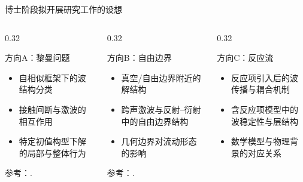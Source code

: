 \documentclass{beamer}
\begin{document}
\begin{frame}{博士阶段拟开展研究工作的设想}
\small

\setlength{\columnsep}{0.6em}

\begin{columns}[T,totalwidth=\textwidth]
    \begin{column}{0.32\textwidth}
        \begin{block}{方向A：黎曼问题}
        \begin{minipage}[t]{\linewidth}
        \footnotesize
        \raggedright
        {\setlength{\itemsep}{0.30em}
        \begin{itemize}
            \item 自相似框架下的波结构分类
            \item 接触间断与激波的相互作用
            \item 特定初值构型下解的局部与整体行为
        \end{itemize}}

        \vspace{0.2em}
        {\scriptsize 参考：\cite{ZhangZheng1990,ChangChenYang1995,ChangChenYang2000}.}
        \end{minipage}
        \end{block}
    \end{column}

    \begin{column}{0.32\textwidth}
        \begin{block}{方向B：自由边界}
        \begin{minipage}[t]{\linewidth}
        \footnotesize
        \raggedright
        {\setlength{\itemsep}{0.30em}
        \begin{itemize}
            \item 真空/自由边界附近的解结构
            \item 跨声激波与反射--衍射中的自由边界结构
            \item 几何边界对流动形态的影响
        \end{itemize}}

        \vspace{0.2em}
        {\scriptsize 参考：\cite{ChenFeldman2003,ChenFeldman2018}.}
        \end{minipage}
        \end{block}
    \end{column}

    \begin{column}{0.32\textwidth}
        \begin{block}{方向C：反应流}
        \begin{minipage}[t]{\linewidth}
        \footnotesize
        \raggedright
        {\setlength{\itemsep}{0.30em}
        \begin{itemize}
            \item 反应项引入后的波传播与耦合机制
            \item 含反应项模型中的波稳定性与层结构
            \item 数学模型与物理背景的对应关系
        \end{itemize}}


\end{minipage}
\end{block}
\end{column}
\end{columns}
\end{frame}
\end{document}
